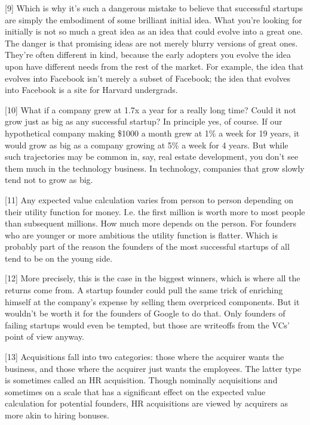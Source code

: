 {[}9{]} Which is why it's such a dangerous mistake to believe that
successful startups are simply the embodiment of some brilliant initial
idea. What you're looking for initially is not so much a great idea as
an idea that could evolve into a great one. The danger is that promising
ideas are not merely blurry versions of great ones. They're often
different in kind, because the early adopters you evolve the idea upon
have different needs from the rest of the market. For example, the idea
that evolves into Facebook isn't merely a subset of Facebook; the idea
that evolves into Facebook is a site for Harvard undergrads.

{[}10{]} What if a company grew at 1.7x a year for a really long time?
Could it not grow just as big as any successful startup? In principle
yes, of course. If our hypothetical company making \$1000 a month grew
at 1\% a week for 19 years, it would grow as big as a company growing at
5\% a week for 4 years. But while such trajectories may be common in,
say, real estate development, you don't see them much in the technology
business. In technology, companies that grow slowly tend not to grow as
big.

{[}11{]} Any expected value calculation varies from person to person
depending on their utility function for money. I.e. the first million is
worth more to most people than subsequent millions. How much more
depends on the person. For founders who are younger or more ambitious
the utility function is flatter. Which is probably part of the reason
the founders of the most successful startups of all tend to be on the
young side.

{[}12{]} More precisely, this is the case in the biggest winners, which
is where all the returns come from. A startup founder could pull the
same trick of enriching himself at the company's expense by selling them
overpriced components. But it wouldn't be worth it for the founders of
Google to do that. Only founders of failing startups would even be
tempted, but those are writeoffs from the VCs' point of view anyway.

{[}13{]} Acquisitions fall into two categories: those where the acquirer
wants the business, and those where the acquirer just wants the
employees. The latter type is sometimes called an HR acquisition. Though
nominally acquisitions and sometimes on a scale that has a significant
effect on the expected value calculation for potential founders, HR
acquisitions are viewed by acquirers as more akin to hiring bonuses.

